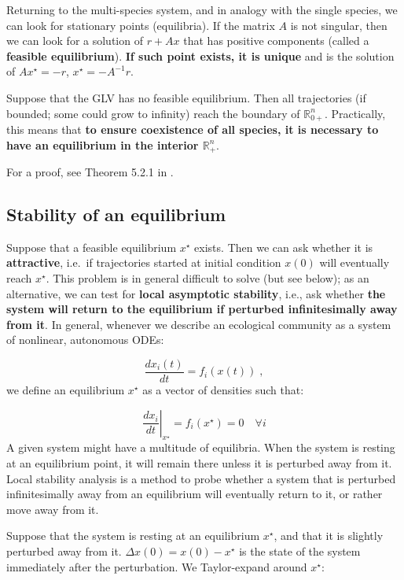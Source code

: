 \documentclass[]{book}
\begin{document}
Returning to the multi-species system, and in analogy with the single species, we can look for stationary points (equilibria). If the matrix \(A\) is not singular, then we can look for a solution of \(r + Ax\) that has positive components (called a \textbf{feasible equilibrium}). \textbf{If such point exists, it is unique} and is the solution of \(Ax^\star = -r\), \(x^\star = -A^{-1}r\).

Suppose that the GLV has no feasible equilibrium. Then all trajectories (if bounded; some could grow to infinity) reach the boundary of \(\mathbb R^n_{0+}\). Practically, this means that \textbf{to ensure coexistence of all species, it is necessary to have an equilibrium in the interior \(\mathbb R^n_{+}\)}.

For a proof, see Theorem 5.2.1 in \citet{hofbauer1998evolutionary}.

\hypertarget{stability-of-an-equilibrium}{%
\subsection{Stability of an equilibrium}\label{stability-of-an-equilibrium}}

Suppose that a feasible equilibrium \(x^\star\) exists. Then we can ask whether it is \textbf{attractive}, i.e.~if trajectories started at initial condition \(x(0)\) will eventually reach \(x^\star\). This problem is in general difficult to solve (but see below); as an alternative, we can test for \textbf{local asymptotic stability}, i.e., ask whether \textbf{the system will return to the equilibrium if perturbed infinitesimally away from it}. In general, whenever we describe an ecological community as a system of nonlinear, autonomous ODEs:

\[
\frac{d x_i (t)}{d t} = f_i (x(t)) \;,
\]
we define an equilibrium \(x^\star\) as a vector of densities such that:

\[
\left. \frac{d x_i}{d t} \right|_{{x}^\star} = f_i
({x}^\star) = 0 \quad \forall i
\]
A given system might have a multitude of equilibria. When the system is resting at an equilibrium point, it will remain there unless it is perturbed away from it. Local stability analysis is a method to probe whether a system that is perturbed infinitesimally away from an equilibrium will eventually return to it, or rather move away from it.

Suppose that the system is resting at an equilibrium \(x^\star\), and that it is slightly perturbed away from it. \(\Delta x(0) = x(0)-x^\star\) is the state of the system immediately after the perturbation. We Taylor-expand around \(x^\star\):
\end{document}
